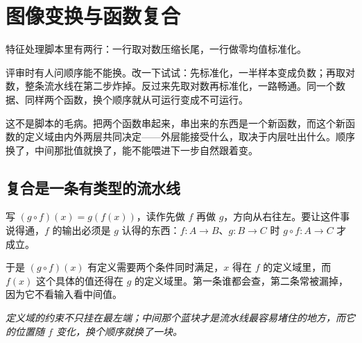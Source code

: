 \section{图像变换与函数复合}
\label{sec:02-Calculus/01-Functions-and-Precalculus/02}

特征处理脚本里有两行：一行取对数压缩长尾，一行做零均值标准化。

评审时有人问顺序能不能换。改一下试试：先标准化，一半样本变成负数；再取对数，整条流水线在第二步炸掉。反过来先取对数再标准化，一路畅通。同一个数据、同样两个函数，换个顺序就从可运行变成不可运行。

这不是脚本的毛病。把两个函数串起来，串出来的东西是一个新函数，而这个新函数的定义域由内外两层共同决定——外层能接受什么，取决于内层吐出什么。顺序换了，中间那批值就换了，能不能喂进下一步自然跟着变。

\subsection{复合是一条有类型的流水线}

写 \((g\circ f)(x)=g(f(x))\)，读作先做 \(f\) 再做 \(g\)，方向从右往左。要让这件事说得通，\(f\) 的输出必须是 \(g\) 认得的东西：\(f:A\to B\)、\(g:B\to C\) 时 \(g\circ f:A\to C\) 才成立。

于是 \((g\circ f)(x)\) 有定义需要两个条件同时满足，\(x\) 得在 \(f\) 的定义域里，而 \(f(x)\) 这个具体的值还得在 \(g\) 的定义域里。第一条谁都会查，第二条常被漏掉，因为它不看输入看中间值。

\begin{center}

\emph{定义域的约束不只挂在最左端；中间那个蓝块才是流水线最容易堵住的地方，而它的位置随 \(f\) 变化，换个顺序就换了一块。}
\end{center}

